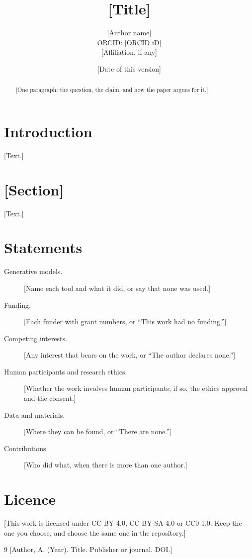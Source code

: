 \documentclass[11pt]{article}
\title{[Title]}
\author{[Author name]\\ \small ORCID: [ORCID iD]\\ \small [Affiliation, if any]}
\date{[Date of this version]}
\theoremstyle{definition}
\begin{document}
\maketitle

\begin{abstract}
[One paragraph: the question, the claim, and how the paper argues for it.]
\end{abstract}

\section{Introduction}
[Text.]

\section{[Section]}
[Text.]

\section*{Statements}
\begin{description}
  \item[Generative models.] [Name each tool and what it did, or say that none was used.]
  \item[Funding.] [Each funder with grant numbers, or ``This work had no funding.'']
  \item[Competing interests.] [Any interest that bears on the work, or ``The author declares none.'']
  \item[Human participants and research ethics.] [Whether the work involves human participants; if so, the ethics approval and the consent.]
  \item[Data and materials.] [Where they can be found, or ``There are none.'']
  \item[Contributions.] [Who did what, when there is more than one author.]
\end{description}

\section*{Licence}
[This work is licensed under CC BY 4.0, CC BY-SA 4.0 or CC0 1.0. Keep the one you choose, and choose the same one in the repository.]

\begin{thebibliography}{9}
 [Author, A. (Year). Title. Publisher or journal. DOI.]
\end{thebibliography}
\end{document}

